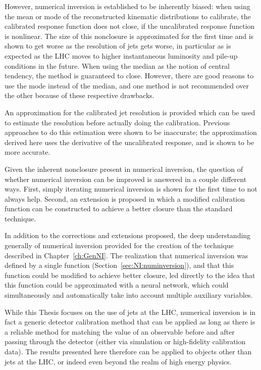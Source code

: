 However, numerical inversion is established to be inherently biased: when using the mean or mode of the reconstructed kinematic distributions to calibrate, the calibrated response function does not close, if the uncalibrated response function is nonlinear.
The size of this nonclosure is approximated for the first time and is shown to get worse as the resolution of jets gets worse, in particular as is expected as the LHC moves to higher instantaneous luminosity and pile-up conditions in the future.
When using the median as the notion of central tendency, the method is guaranteed to close.
However, there are good reasons to use the mode instead of the median, and one method is not recommended over the other because of these respective drawbacks.

An approximation for the calibrated jet resolution is provided which can be used to estimate the resolution before actually doing the calibration.
Previous approaches to do this estimation were shown to be inaccurate; the approximation derived here uses the derivative of the uncalibrated response, and is shown to be more accurate.

Given the inherent nonclosure present in numerical inversion, the question of whether numerical inversion can be improved is answered in a couple different ways. 
First, simply iterating numerical inversion is shown for the first time to not always help.
Second, an extension is proposed in which a modified calibration function can be constructed to achieve a better closure than the standard technique.

In addition to the corrections and extensions proposed, the deep understanding generally of numerical inversion provided for the creation of the technique described in Chapter~\ref{ch:GenNI}.
The realization that numerical inversion was defined by a single function (Section~\ref{sec:NI:numinversion}), and that this function could be modified to achieve better closure, led directly to the idea that this function could be approximated with a neural network, which could simultaneously and automatically take into account multiple auxiliary variables.

While this Thesis focuses on the use of jets at the LHC, numerical inversion is in fact a generic detector calibration method that can be applied as long as there is a reliable method for matching the value of an observable before and after passing through the detector (either via simulation or high-fidelity calibration data).
The results presented here therefore can be applied to objects other than jets at the LHC, or indeed even beyond the realm of high energy physics.
